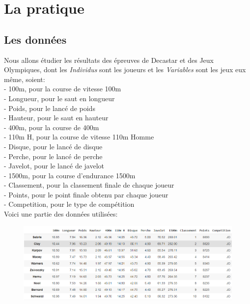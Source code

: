 \documentclass{article}
\begin{document}
\section{La pratique}

\subsection{Les données}

Nous allons étudier les résultats des épreuves de Decastar et des Jeux Olympiques, dont les \textit{Individus} sont les joueurs et les \textit{Variables} sont les jeux eux même, soient:
\newline
\\
- 100m, pour la course de vitesse 100m \\
- Longueur, pour le saut en longueur \\
- Poids, pour le lancé de poids \\
- Hauteur, pour le saut en hauteur \\
- 400m, pour la course de 400m \\
- 110m H, pour la course de vitesse 110m Homme \\
- Disque, pour le lancé de disque \\
- Perche, pour le lancé de perche \\
- Javelot, pour le lancé de javelot \\
- 1500m, pour la course d'endurance 1500m \\
- Classement, pour la classement finale de chaque joueur \\
- Points, pour le point finale obtenu par chaque joueur \\
- Competition, pour le type de compétition \\

Voici une partie des données utilisées:

\begin{figure}[h!]
\includegraphics[width=\linewidth]{images/data_initials.png}
\end{figure}
\end{document}
